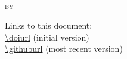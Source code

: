 \begin{titlepage}
\begin{center}
\vspace{1.5cm}

\textsc{\Large ~}\\[1cm] %

%
{\huge \bfseries \ttitle\par}\vspace{1cm} %



\textsc{\Large by}\\[1cm]

{\Large \authorname}

\vspace{1.5cm}


\groupname%

\vfill

{\large \tdate} %

\vspace{0.25ex}

{\small \tversion}

\vspace{0.25ex}

{\small Links to this document:}\\
{\small \url{\doiurl}} (initial version)\\
{\small \url{\githuburl} (most recent version)}

\vfill
\end{center}

\restoregeometry

\end{titlepage}


